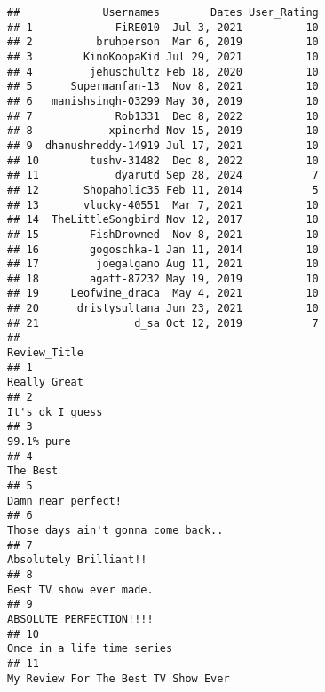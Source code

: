 \documentclass[
]{article}
\begin{document}
\begin{verbatim}
##             Usernames        Dates User_Rating
## 1             FiRE010  Jul 3, 2021          10
## 2          bruhperson  Mar 6, 2019          10
## 3        KinoKoopaKid Jul 29, 2021          10
## 4         jehuschultz Feb 18, 2020          10
## 5      Supermanfan-13  Nov 8, 2021          10
## 6   manishsingh-03299 May 30, 2019          10
## 7             Rob1331  Dec 8, 2022          10
## 8            xpinerhd Nov 15, 2019          10
## 9  dhanushreddy-14919 Jul 17, 2021          10
## 10        tushv-31482  Dec 8, 2022          10
## 11            dyarutd Sep 28, 2024           7
## 12       Shopaholic35 Feb 11, 2014           5
## 13       vlucky-40551  Mar 7, 2021          10
## 14  TheLittleSongbird Nov 12, 2017          10
## 15        FishDrowned  Nov 8, 2021          10
## 16        gogoschka-1 Jan 11, 2014          10
## 17         joegalgano Aug 11, 2021          10
## 18        agatt-87232 May 19, 2019          10
## 19     Leofwine_draca  May 4, 2021          10
## 20      dristysultana Jun 23, 2021          10
## 21               d_sa Oct 12, 2019           7
##                                                                                                                Review_Title
## 1                                                                                                              Really Great
## 2                                                                                                           It's ok I guess
## 3                                                                                                                99.1% pure
## 4                                                                                                                  The Best
## 5                                                                                                        Damn near perfect!
## 6                                                                                        Those days ain't gonna come back..
## 7                                                                                                    Absolutely Brilliant!!
## 8                                                                                                   Best TV show ever made.
## 9                                                                                                   ABSOLUTE PERFECTION!!!!
## 10                                                                                               Once in a life time series
## 11                                                                                      My Review For The Best TV Show Ever

\end{verbatim}
\end{document}
